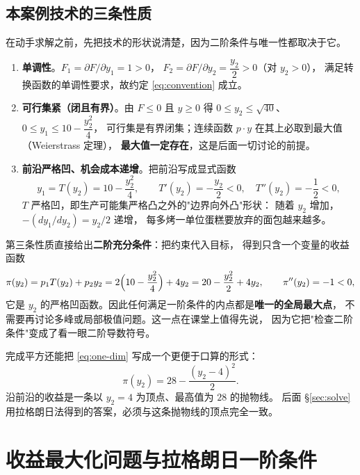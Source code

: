 \subsection{本案例技术的三条性质}

在动手求解之前，先把技术的形状说清楚，因为二阶条件与唯一性都取决于它。

\begin{enumerate}
  \item \textbf{单调性}。$F_1=\partial F/\partial y_1=1>0$，
        $F_2=\partial F/\partial y_2=\dfrac{y_2}{2}>0$（对 $y_2>0$），
        满足转换函数的单调性要求，故约定 \eqref{eq:convention} 成立。
  \item \textbf{可行集紧（闭且有界）}。由 $F\le 0$ 且 $y\ge 0$ 得
        $0\le y_2\le \sqrt{40}$、$0\le y_1\le 10-\dfrac{y_2^{2}}{4}$，
        可行集是有界闭集；连续函数 $p\cdot y$ 在其上必取到最大值（Weierstrass 定理），
        \textbf{最大值一定存在}，这是后面一切讨论的前提。
  \item \textbf{前沿严格凹、机会成本递增}。把前沿写成显式函数
        \begin{equation}
        y_1=T(y_2)=10-\frac{y_2^{2}}{4},\qquad
        T'(y_2)=-\frac{y_2}{2}<0,\quad T''(y_2)=-\frac12<0,
        \label{eq:ppf-explicit}
        \end{equation}
        $T$ 严格凹，即生产可能集严格凸之外的"边界向外凸"形状：
        随着 $y_2$ 增加，$-(dy_1/dy_2)=y_2/2$ 递增，
        每多烤一单位蛋糕要放弃的面包越来越多。
\end{enumerate}

第三条性质直接给出\textbf{二阶充分条件}：把约束代入目标，
得到只含一个变量的收益函数
\begin{equation}
\pi(y_2)=p_1T(y_2)+p_2y_2
=2\Bigl(10-\frac{y_2^{2}}{4}\Bigr)+4y_2
=20-\frac{y_2^{2}}{2}+4y_2,
\qquad \pi''(y_2)=-1<0,
\label{eq:one-dim}
\end{equation}
它是 $y_2$ 的严格凹函数。因此任何满足一阶条件的内点都是\textbf{唯一的全局最大点}，
不需要再讨论多峰或局部极值问题。这一点在课堂上值得先说，
因为它把"检查二阶条件"变成了看一眼二阶导数符号。

完成平方还能把 \eqref{eq:one-dim} 写成一个更便于口算的形式：
\begin{equation}
\pi(y_2)=28-\frac{(y_2-4)^{2}}{2}.
\label{eq:pi-complete-square}
\end{equation}
沿前沿的收益是一条以 $y_2=4$ 为顶点、最高值为 $28$ 的抛物线。
后面 \S\ref{sec:solve} 用拉格朗日法得到的答案，必须与这条抛物线的顶点完全一致。

\section{收益最大化问题与拉格朗日一阶条件}
\label{sec:foc}

